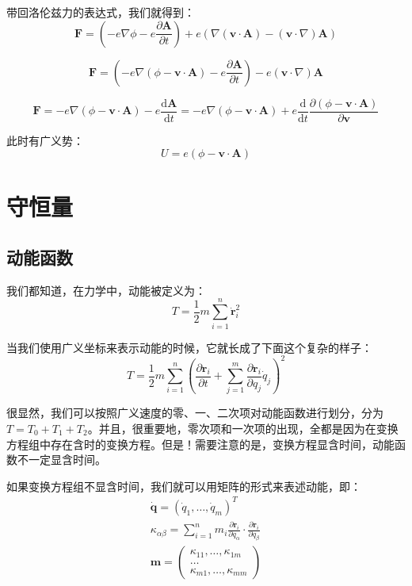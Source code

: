 \documentclass[a4paper, 10pt, openany]{book}%
\begin{document}
    带回洛伦兹力的表达式，我们就得到：
    \begin{equation}\textbf{F}=(-e\nabla\phi-e\frac{\partial \textbf{A}}{\partial t})+e(\nabla(\textbf{v}\cdot\textbf{A})-(\textbf{v}\cdot\nabla)\textbf{A})
    \end{equation}

    \begin{equation}\textbf{F}=(-e\nabla(\phi-\textbf{v}\cdot\textbf{A})-e\frac{\partial \textbf{A}}{\partial t})-e(\textbf{v}\cdot\nabla)\textbf{A}
    \end{equation}
    
  
    \begin{equation}\textbf{F}=-e\nabla(\phi-\textbf{v}\cdot\textbf{A})-e\frac{\mathrm{d} \textbf{A}}{\mathrm{d} t}=-e\nabla(\phi-\textbf{v}\cdot\textbf{A})+e\frac{\mathrm{d}}{\mathrm{d} t}\frac{\partial (\phi-\textbf{v}\cdot\textbf{A})}{\partial \textbf{v}}
    \end{equation}

    此时有广义势：
    \begin{equation}U=e(\phi-\textbf{v}\cdot\textbf{A})\end{equation}
    \section{守恒量}

    \subsection{动能函数}
    我们都知道，在力学中，动能被定义为：
    \begin{equation}T=\frac{1}{2}m\sum_{i=1}^n\dot{\textbf{r}}_i^2\end{equation}

    当我们使用广义坐标来表示动能的时候，它就长成了下面这个复杂的样子：
\begin{equation}
T=\frac{1}{2}m\sum_{i=1}^n(\frac{\partial {\textbf{r}}_i}{\partial t}+\sum_{j=1}^m\frac{\partial {\textbf{r}}_i}{\partial q_j}\dot{q}_j)^2
\end{equation}

很显然，我们可以按照广义速度的零、一、二次项对动能函数进行划分，分为$T=T_0+T_1+T_2$。并且，很重要地，零次项和一次项的出现，全都是因为在变换方程组中存在含时的变换方程。但是！需要注意的是，变换方程显含时间，动能函数不一定显含时间。

如果变换方程组不显含时间，我们就可以用矩阵的形式来表述动能，即：
\begin{align}
\dot{\textbf{q}}=(\dot{q}_1,\dots,\dot{q}_m)^T\\
\kappa_{\alpha\beta}=\sum_{i=1}^nm_i\frac{\partial\dot{\textbf{r}}_i}{\partial q_\alpha}\cdot\frac{\partial\dot{\textbf{r}}_i}{\partial q_\beta}\\
\textbf{m}=\begin{pmatrix} \kappa_{11}, \dots, \kappa_{1m}\\
  \dots\\
  \kappa_{m1}, \dots, \kappa_{mm}\end{pmatrix}
\end{align}
\end{document}
